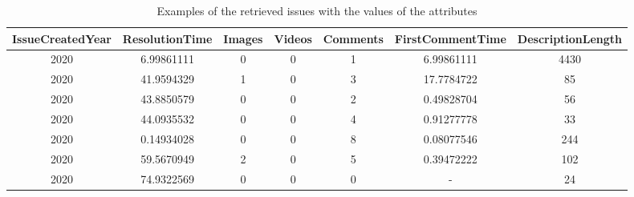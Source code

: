 \begin{table*}[h]
    \begin{center}
    \caption{Examples of the retrieved issues with the values of the attributes}
    \begin{tabular}{c c c c c c c} 
      \toprule
      \textbf{IssueCreatedYear} &
      \textbf{ResolutionTime} &
      \textbf{Images} &
      \textbf{Videos} &
      \textbf{Comments} &
      \textbf{FirstCommentTime} &
      \textbf{DescriptionLength} \\
      \midrule
      2020 & 6.99861111 & 0 & 0 & 1 & 6.99861111 & 4430\\
      2020 & 41.9594329 & 1 & 0 & 3 & 17.7784722 & 85\\
      2020 & 43.8850579 & 0 & 0 & 2 & 0.49828704 & 56\\
      2020 & 44.0935532 & 0 & 0 & 4 & 0.91277778 & 33\\
      2020 & 0.14934028 & 0 & 0 & 8 & 0.08077546 & 244\\
      2020 & 59.5670949 & 2 & 0 & 5 & 0.39472222 & 102\\
      2020 & 74.9322569 & 0 & 0 & 0 & -          & 24\\
      \bottomrule
    \end{tabular}
    \label{tab:example-dataset}
    \end{center}
  \end{table*}
